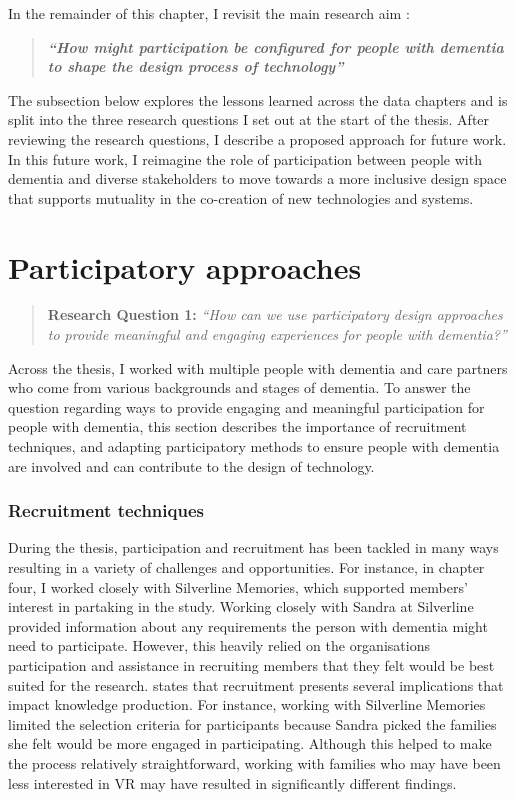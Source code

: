 In the remainder of this chapter, I revisit the main research aim :
\begin{quote}
\textbf{\textit{``How might participation be configured for people with dementia to shape the design process of technology''}}
\end{quote}

The subsection below explores the lessons learned across the data chapters and is split into the three research questions I set out at the start of the thesis. After reviewing the research questions, I describe a proposed approach for future work. In this future work, I reimagine the role of participation between people with dementia and diverse stakeholders to move towards a more inclusive design space that supports mutuality in the co-creation of new technologies and systems. 

\section{Participatory approaches}
\label{Discussion:RQ1}
\begin{quote}
\textbf{    Research Question 1:
}    
\textit{    “How can we use participatory design approaches to provide meaningful and engaging experiences for people with dementia?”}
\end{quote}

Across the thesis, I worked with multiple people with dementia and care partners who come from various backgrounds and stages of dementia. To answer the question regarding ways to provide engaging and meaningful participation for people with dementia, this section describes the importance of recruitment techniques, and adapting participatory methods to ensure people with dementia are involved and can contribute to the design of technology. 

\subsubsection{Recruitment techniques}
\label{RecruitmentTechniques}
During the thesis, participation and recruitment has been tackled in many ways resulting in a variety of challenges and opportunities. For instance, in chapter four, I worked closely with Silverline Memories, which supported members' interest in partaking in the study. Working closely with Sandra at Silverline provided information about any requirements the person with dementia might need to participate. However, this heavily relied on the organisations participation and assistance in recruiting members that they felt would be best suited for the research. \cite{kristensen2015voices} states that recruitment presents several implications that impact knowledge production. For instance, working with Silverline Memories limited the selection criteria for participants because Sandra picked the families she felt would be more engaged in participating. Although this helped to make the process relatively straightforward, working with families who may have been less interested in VR may have resulted in significantly different findings.


